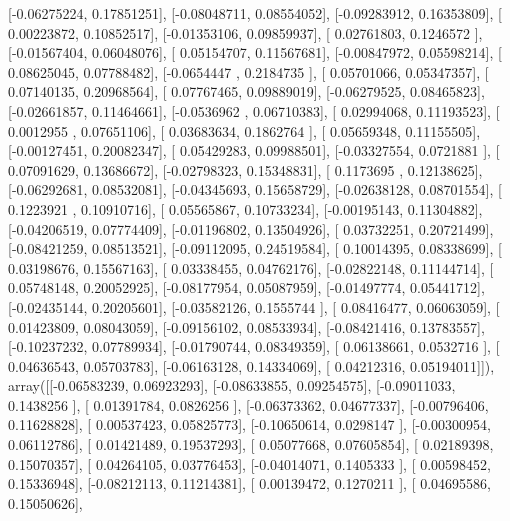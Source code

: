 \documentclass{article}
\begin{document}
       [-0.06275224,  0.17851251],
       [-0.08048711,  0.08554052],
       [-0.09283912,  0.16353809],
       [ 0.00223872,  0.10852517],
       [-0.01353106,  0.09859937],
       [ 0.02761803,  0.1246572 ],
       [-0.01567404,  0.06048076],
       [ 0.05154707,  0.11567681],
       [-0.00847972,  0.05598214],
       [ 0.08625045,  0.07788482],
       [-0.0654447 ,  0.2184735 ],
       [ 0.05701066,  0.05347357],
       [ 0.07140135,  0.20968564],
       [ 0.07767465,  0.09889019],
       [-0.06279525,  0.08465823],
       [-0.02661857,  0.11464661],
       [-0.0536962 ,  0.06710383],
       [ 0.02994068,  0.11193523],
       [ 0.0012955 ,  0.07651106],
       [ 0.03683634,  0.1862764 ],
       [ 0.05659348,  0.11155505],
       [-0.00127451,  0.20082347],
       [ 0.05429283,  0.09988501],
       [-0.03327554,  0.0721881 ],
       [ 0.07091629,  0.13686672],
       [-0.02798323,  0.15348831],
       [ 0.1173695 ,  0.12138625],
       [-0.06292681,  0.08532081],
       [-0.04345693,  0.15658729],
       [-0.02638128,  0.08701554],
       [ 0.1223921 ,  0.10910716],
       [ 0.05565867,  0.10733234],
       [-0.00195143,  0.11304882],
       [-0.04206519,  0.07774409],
       [-0.01196802,  0.13504926],
       [ 0.03732251,  0.20721499],
       [-0.08421259,  0.08513521],
       [-0.09112095,  0.24519584],
       [ 0.10014395,  0.08338699],
       [ 0.03198676,  0.15567163],
       [ 0.03338455,  0.04762176],
       [-0.02822148,  0.11144714],
       [ 0.05748148,  0.20052925],
       [-0.08177954,  0.05087959],
       [-0.01497774,  0.05441712],
       [-0.02435144,  0.20205601],
       [-0.03582126,  0.1555744 ],
       [ 0.08416477,  0.06063059],
       [ 0.01423809,  0.08043059],
       [-0.09156102,  0.08533934],
       [-0.08421416,  0.13783557],
       [-0.10237232,  0.07789934],
       [-0.01790744,  0.08349359],
       [ 0.06138661,  0.0532716 ],
       [ 0.04636543,  0.05703783],
       [-0.06163128,  0.14334069],
       [ 0.04212316,  0.05194011]]), array([[-0.06583239,  0.06923293],
       [-0.08633855,  0.09254575],
       [-0.09011033,  0.1438256 ],
       [ 0.01391784,  0.0826256 ],
       [-0.06373362,  0.04677337],
       [-0.00796406,  0.11628828],
       [ 0.00537423,  0.05825773],
       [-0.10650614,  0.0298147 ],
       [-0.00300954,  0.06112786],
       [ 0.01421489,  0.19537293],
       [ 0.05077668,  0.07605854],
       [ 0.02189398,  0.15070357],
       [ 0.04264105,  0.03776453],
       [-0.04014071,  0.1405333 ],
       [ 0.00598452,  0.15336948],
       [-0.08212113,  0.11214381],
       [ 0.00139472,  0.1270211 ],
       [ 0.04695586,  0.15050626],
\end{document}
